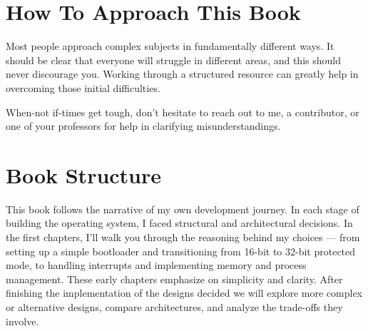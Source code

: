 \section{How To Approach This Book}

Most people approach complex subjects in fundamentally different ways. It should be clear that everyone 
will struggle in different areas, and this should never discourage you. Working through a structured 
resource can greatly help in overcoming those initial difficulties.

When-not if-times get tough, don't hesitate to reach out to me, a contributor, or one of your professors 
for help in clarifying misunderstandings.

\section{Book Structure}

This book follows the narrative of my own development journey. In each stage of building the operating 
system, I faced structural and architectural decisions. In the first chapters, I'll walk you through 
the reasoning behind my choices — from setting up a simple bootloader and transitioning from 16-bit to 
32-bit protected mode, to handling interrupts and implementing memory and process management. These early 
chapters emphasize on simplicity and clarity. After finishing the implementation of the designs decided we 
will explore more complex or alternative designs, compare architectures, and analyze the trade-offs they involve.